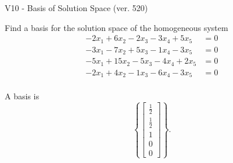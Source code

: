 \begin{exercise}
  \begin{exerciseTitle}V10 - Basis of Solution Space (ver. 520)\end{exerciseTitle}
  \begin{exerciseStatement}
    Find a basis for the solution space of the homogeneous system 
\begin{align*}
 -2 x_ 1 + 6 x_ 2 -2 x_ 3 -3 x_ 4 + 5 x_ 5 &= 0  \\ 
  -3 x_ 1 -7 x_ 2 + 5 x_ 3 -1 x_ 4 -3 x_ 5 &= 0  \\ 
  -5 x_ 1 + 15 x_ 2 -5 x_ 3 -4 x_ 4 + 2 x_ 5 &= 0  \\ 
  -2 x_ 1 + 4 x_ 2 -1 x_ 3 -6 x_ 4 -3 x_ 5 &= 0  \\ 
 \end{align*}


 
  \end{exerciseStatement}

  \begin{exerciseAnswer}
   A basis is   
\[\left\{\left[\begin{array}{c}
\frac{1}{2} \\
\frac{1}{2} \\
1 \\
0 \\
0
\end{array}\right]\right\}.\]

  


  \end{exerciseAnswer}
\end{exercise}